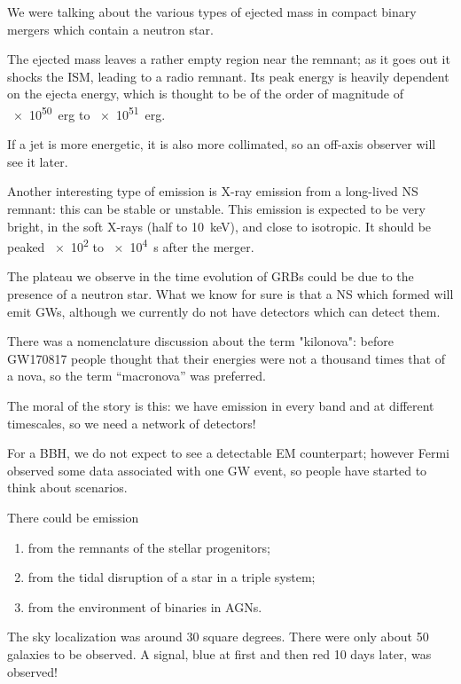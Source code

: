 \documentclass[main.tex]{subfiles}
\begin{document}

We were talking about the various types of ejected mass in compact binary mergers
which contain a neutron star. 

The ejected mass leaves a rather empty region near the remnant; 
as it goes out it shocks the ISM, leading to a radio remnant. 
Its peak energy is heavily dependent on the ejecta energy, 
which is thought to be of the order of magnitude
of \SI{e50}{erg} to \SI{e51}{erg}. 

If a jet is more energetic, it is also more collimated, 
so an off-axis observer will see it later. 

Another interesting type of emission is X-ray emission from a long-lived NS remnant: 
this can be stable or unstable. 
This emission is expected to be very bright, in the soft X-rays (half to \SI{10}{keV}), and close to isotropic. 
It should be peaked \num{e2} to \SI{e4}{s} after the merger. 

The plateau we observe in the time evolution of GRBs could be due to the presence of a neutron star. 
What we know for sure is that a NS which formed will emit GWs, although 
we currently do not have detectors which can detect them. 

There was a nomenclature discussion about the term "kilonova": before GW170817 people 
thought that their energies were not a thousand times that of a nova, so 
the term ``macronova'' was preferred. 

The moral of the story is this: we have emission in every band and at different 
timescales, so we need a network of detectors! 

For a BBH, we do not expect to see a detectable EM counterpart; 
however Fermi observed some data associated with one GW event, so people have 
started to think about scenarios. 

There could be emission 
\begin{enumerate}
    \item from the remnants of the stellar progenitors;
    \item from the tidal disruption of a star in a triple system;
    \item from the environment of binaries in AGNs. 
\end{enumerate}

The sky localization was around 30 square degrees.
There were only about 50 galaxies to be observed.
A signal, blue at first and then red 10 days later, was observed! 
\end{document}
